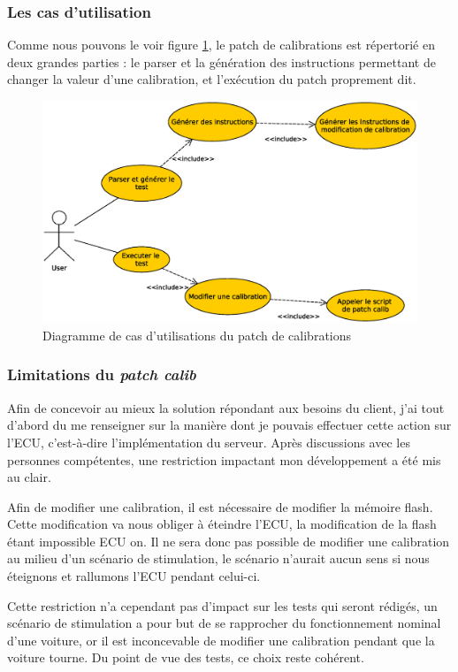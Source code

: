 \subsubsection{Les cas d'utilisation}
		Comme nous pouvons le voir figure \ref{fig:patch-cal-usecase}, le patch de calibrations est répertorié en deux grandes parties : le parser et la génération des instructions permettant de changer la valeur d'une calibration, et l'exécution du patch proprement dit.
		\begin{figure}[H]
			\centering
			\includegraphics[width=12cm]{contents/images/patch-cal_usecase.eps}
			\caption{Diagramme de cas d'utilisations du patch de calibrations}
			\label{fig:patch-cal-usecase}
		\end{figure}

		\subsubsection{Limitations du \textit{patch calib}}\label{ecustop}
		Afin de concevoir au mieux la solution répondant aux besoins du client, j'ai tout d'abord du me renseigner sur la manière dont je pouvais effectuer cette action sur l'ECU, c'est-à-dire l'implémentation du serveur. Après discussions avec les personnes compétentes, une restriction impactant mon développement a été mis au clair.
		
		Afin de modifier une calibration, il est nécessaire de modifier la mémoire flash. Cette modification va nous obliger à éteindre l'ECU, la modification de la flash étant impossible ECU on. Il ne sera donc pas possible de modifier une calibration au milieu d'un scénario de stimulation, le scénario n'aurait aucun sens si nous éteignons et rallumons l'ECU pendant celui-ci.
		
		Cette restriction n'a cependant pas d'impact sur les tests qui seront rédigés, un scénario de stimulation a pour but de se rapprocher du fonctionnement nominal d'une voiture, or il est inconcevable de modifier une calibration pendant que la voiture tourne. Du point de vue des tests, ce choix reste cohérent. 


